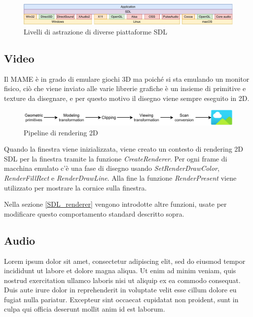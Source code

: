 \begin{figure}[H]
	\includegraphics[width=\linewidth]{immagini/sdl}
	\caption{Livelli di astrazione di diverse piattaforme SDL}
	\label{fig:sdl}
\end{figure}

\subsection{Video}
Il MAME è in grado di emulare giochi 3D ma poiché si sta emulando un monitor fisico, ciò che viene inviato alle varie librerie grafiche è un insieme di primitive e texture da disegnare, e per questo motivo il disegno viene sempre eseguito in 2D.

\begin{figure}[H]
	\includegraphics[width=\linewidth]{immagini/rendering_pipeline}
	\caption{Pipeline di rendering 2D}
	\label{fig:rendering_pipeline}
\end{figure}

Quando la finestra viene inizializzata, viene creato un contesto di rendering 2D SDL per la finestra tramite la funzione \textit{CreateRenderer}. Per ogni frame di macchina emulato c'è una fase di disegno usando \textit{SetRenderDrawColor}, \textit{RenderFillRect} e \textit{RenderDrawLine}. Alla fine la funzione \textit{RenderPresent} viene utilizzato per mostrare la cornice sulla finestra.

Nella sezione \ref{SDL_renderer} vengono introdotte altre funzioni, usate per modificare questo comportamento standard descritto sopra.


\subsection{Audio}
Lorem ipsum dolor sit amet, consectetur adipiscing elit, sed do eiusmod tempor incididunt ut labore et dolore magna aliqua. Ut enim ad minim veniam, quis nostrud exercitation ullamco laboris nisi ut aliquip ex ea commodo consequat. Duis aute irure dolor in reprehenderit in voluptate velit esse cillum dolore eu fugiat nulla pariatur. Excepteur sint occaecat cupidatat non proident, sunt in culpa qui officia deserunt mollit anim id est laborum.



